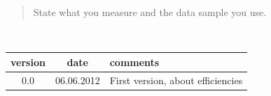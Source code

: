 \begin{titlepage}
\vspace{\fill}

\begin{abstract}
  \noindent
State what you measure and the data sample you use.
\end{abstract}

\vspace*{2.0cm}
\vspace{\fill}

\end{titlepage}


\pagestyle{empty}  %


\newpage
\setcounter{page}{2}
\mbox{~}
\begin{tabular}{|c|c|l|}
\hline
{\sc version} & {\sc date} & {\sc comments}\\
\hline
0.0 & 06.06.2012 & First version, about efficiencies\\
\hline
\end{tabular}

\cleardoublepage
